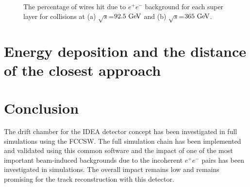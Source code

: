 \documentclass{article}
\begin{document}
\begin{figure}[!h]
\hfil
{}
\caption{The percentage of wires hit due to $e^+e^-$ background for each super layer for collisions at (a) $\sqrt{s}$=$92.5\,\mathrm{\,Ge\kern -0.1em V}$ and (b) $\sqrt{s}$=$365\,\mathrm{\,Ge\kern -0.1em V}$.}
\label{fig_simhitspercent}
\end{figure}

\section{Energy deposition and the distance of the closest approach}



\section{Conclusion}
The drift chamber for the IDEA detector concept has been investigated in full simulations using the FCCSW. The full simulation chain has been implemented and validated using this common software and the impact of one of the most important beam-induced backgrounds due to the incoherent $e^+e^-$ pairs has been investigated in simulations. The overall impact remains low and remains promising for the track reconstruction with this detector.



\end{document}
